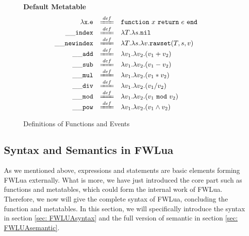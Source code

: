 \documentclass{article}
\begin{document}

\begin{figure}[P]
\caption{Definitions of Functions and Events}
{\bf Default Metatable}
\label{fig:FW2.1metamethods}
\[
\begin{array}{rclcl}
{\tt \aFunction{x}{e}} & \xlongequal[]{def}  & 
          {\tt function} ~x~{\tt return}~e~{\tt end}\\

  {\tt \_\_index}  & \xlongequal[]{def} & \aFunction{T}{\aFunction{s}{\tt nil}}\\
  
  {\tt \_\_newindex} & \xlongequal[]{def}  & \aFunction{T}{\aFunction{s}{\aFunction{v}{{\tt rawset}(T,s,v)}}}\\
 {\tt \_\_add}   & \xlongequal[]{def}  & \aFunction{v_1}{\aFunction{v_2}{(v_1+v_2)}} \\
 {\tt \_\_sub}   & \xlongequal[]{def}  & \aFunction{v_1}{\aFunction{v_2}{(v_1-v_2)}} \\
 {\tt \_\_mul}   & \xlongequal[]{def}  & \aFunction{v_1}{\aFunction{v_2}{(v_1*v_2)}} \\
 {\tt \_\_div}   & \xlongequal[]{def}  & \aFunction{v_1}{\aFunction{v_2}{(v_1/v_2)}} \\
 {\tt \_\_mod}   & \xlongequal[]{def}  & \aFunction{v_1}{\aFunction{v_2}{(v_1~{\tt mod}~v_2)}} \\
 {\tt \_\_pow}   & \xlongequal[]{def}  & \aFunction{v_1}{\aFunction{v_2}{(v_1 \wedge v_2)}} \\
         
\end{array}
\]
\end{figure}




\subsection{Syntax and Semantics in FWLua}\label{sec: syntax and semantic}
As we mentioned above, expressions and statements are basic elements forming FWLua externally. What is more, we have just introduced the core part such as functions and metatables, which could form the internal work of FWLua. Therefore, we now will give the complete syntax of FWLua, concluding the function and metatables. In this section, we will specifically introduce the syntax in section \ref{sec: FWLUAsyntax} and the full version of semantic in section \ref{sec: FWLUAsemantic}.
\end{document}
